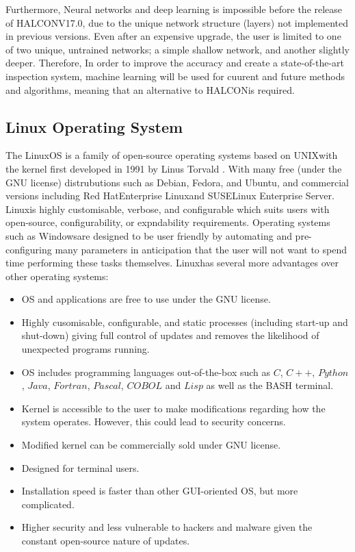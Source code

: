 \documentclass[fleqn,twoside]{article}
\begin{document}
Furthermore, Neural networks and deep learning is impossible before the release of HALCON\texttrademark V17.0, due to the unique network structure (layers) not implemented in previous versions. Even after an expensive upgrade, the user is limited to one of two unique, untrained networks; a simple shallow network, and another slightly deeper. Therefore, In order to improve the accuracy and create a state-of-the-art inspection system, machine learning will be used for cuurent and future methods and algorithms, meaning that an alternative to HALCON\texttrademark is required.


\subsection{Linux Operating System}


The Linux\textregistered OS is a family of open-source operating systems based on UNIX\textregistered with the kernel first developed in 1991 by Linus Torvald \cite{wiki_linux}. With many free (under the GNU license) distrubutions such as Debian\textregistered, Fedora\textregistered, and Ubuntu\textregistered, and commercial versions including Red Hat\textregistered Enterprise Linux\textregistered and SUSE\textregistered Linux Enterprise Server\textregistered. Linux\textregistered is highly customisable, verbose, and configurable which suits users with open-source, configurability, or expndability requirements. Operating systems such as Windows\textregistered are designed to be user friendly by automating and pre-configuring many parameters in anticipation that the user will not want to spend time performing these tasks themselves. Linux\textregistered has several more advantages over other operating systems:

\begin{itemize}
	\item OS and applications are free to use under the GNU license.
	\item Highly cusomisable, configurable, and static processes (including start-up and shut-down) giving full control of updates and removes the likelihood of unexpected programs running.
	\item OS includes programming languages out-of-the-box such as $C$, $C++$, $Python$, $Java$, $Fortran$, $Pascal$, $COBOL$ and $Lisp$ as well as the BASH terminal.
	\item Kernel is accessible to the user to make modifications regarding how the system operates. However, this could lead to security concerns.
	\item Modified kernel can be commercially sold under GNU license.
	\item Designed for terminal users.
	\item Installation speed is faster than other GUI-oriented OS, but more complicated.
	\item Higher security and less vulnerable to hackers and malware given the constant open-source nature of updates. 
\end{itemize}
\end{document}
